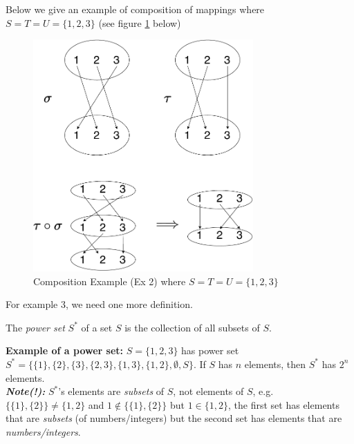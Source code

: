 \begin{example}
Below we give an example of composition of mappings where $S=T=U=\{1,2,3\}$ (see figure \ref{fig:composition_example} below)
\begin{figure}[h!]
    \centering
    \includegraphics[width=0.75\textwidth]{Figures/composition_diagram-cropped.pdf}
    \caption{Composition Example (Ex 2) where $S=T=U=\{1,2,3\}$}
    \label{fig:composition_example}
\end{figure}
\end{example}
\noindent For example 3, we need one more definition.
\begin{definition}
The \textit{power set} $S^{*}$ of a set $S$ is the collection of all subsets of $S$.
\end{definition}
\textbf{Example of a power set:} $S=\{1,2,3\}$ has power set $S^*=\{\{1\},\{2\},\{3\},\{2,3\},\{1,3\},\{1,2\},\emptyset,S\}$. If $S$ has $n$ elements, then $S^*$ has $2^n$ elements. \\
\noindent \textbf{\textit{Note(!):}} $S^{*}$'s elements are \textit{subsets} of $S$, not elements of $S$, e.g. $\{\{1\},\{2\}\}\neq \{1,2\}$ and $1\not \in \{\{1\},\{2\}\}$ but $1\in \{1,2\}$, the first set has elements that are \textit{subsets} (of numbers/integers) but the second set has elements that are \textit{numbers/integers}.
